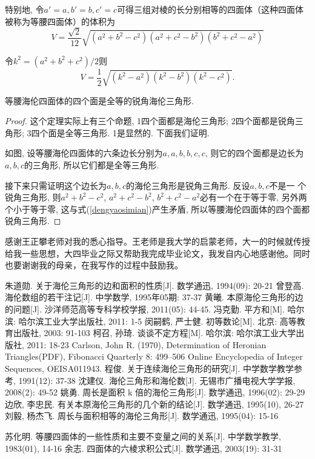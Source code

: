 \documentclass[12pt]{article}
\begin{document}
特别地, 令$a'=a,b'=b,c'=c$可得三组对棱的长分别相等的四面体（这种四面体被称为等腰四面体）的体积为
    \begin{equation}\label{dengyaosimian}
         V=\frac{\sqrt2}{12}\sqrt{(a^2+b^2-c^2)(a^2+c^2-b^2)(b^2+c^2-a^2)} 
    \end{equation}

令$k^2=(a^2+b^2+c^2)/2$则
    \begin{equation*}\label{tijik}
        V=\dfrac12\sqrt{(k^2-a^2)(k^2-b^2)(k^2-c^2)}.
    \end{equation*}

\begin{theorem}
    等腰海伦四面体的四个面是全等的锐角海伦三角形. 
\end{theorem}
\begin{proof}
    这个定理实际上有三个命题, \circled1四个面都是海伦三角形; \circled2四个面都是锐角三角形; \circled3四个面是全等三角形. \circled1是显然的. 下面我们证明. 

如图, 设等腰海伦四面体的六条边长分别为$a,a,b,b,c,c$, 则它的四个面都是边长为$a,b,c$的三角形, 所以它们都是全等三角形. 

接下来只需证明这个边长为$a,b,c$的海伦三角形是锐角三角形. 反设$a,b,c$不是一 个锐角三角形, 则$a^2+b^2-c^2$, $a^2+c^2-b^2$, $b^2+c^2-a^2$必有一个在于等于零, 另外两个小于等于零, 这与式(\ref{dengyaosimian})产生矛盾, 所以等腰海伦四面体的四个面都锐角三角形. 
\end{proof}

感谢王正攀老师对我的悉心指导。王老师是我大学的启蒙老师，大一的时候就传授给我一些思想，大四毕业之际又帮助我完成毕业论文，我发自内心地感谢他。同时也要谢谢我的母亲，在我写作的过程中鼓励我。

\begin{mybib}
朱道勋. 关于海伦三角形的边和面积的性质[J]. 数学通迅, 1994(09): 20-21
曾登高. 海伦数组的若干注记[J]. 中学数学, 1995年05期: 37-37
黄曦. 本原海伦三角形的边的问题[J]. 沙洋师范高等专科学校学报, 2011(05): 44-45.%
冯克勤. 平方和[M]. 哈尔滨: 哈尔滨工业大学出版社, 2011: 1-5
闵嗣鹤, 严士健. 初等数论[M]. 北京: 高等教育出版社, 2003: 91-103 %
柯召, 孙琦. 谈谈不定方程[M]. 哈尔滨: 哈尔滨工业大学出版社, 2011: 18-23
Carlson, John R. (1970), Determination of Heronian Triangles(PDF), Fibonacci Quarterly 8: 499–506
Online Encyclopedia of Integer Sequences, OEIS A011943.
程俊. 关于连续海伦三角形的研究[J]. 中学数学教学参考, 1991(12): 37-38
沈建仪. 海伦三角形和海伦数[J]. 无锡市广播电视大学学报, 2008(2): 49-52
姚勇. 周长是面积 k 倍的海伦三角形[J]. 数学通迅, 1996(02): 29-29
边欣, 李忠民. 有关本原海伦三角形的几个新的结论[J]. 数学通迅, 1995(10), 26-27
刘毅, 杨杰飞. 周长与面积相等的海伦三角形[J]. 数学通迅, 1995(04): 15-16

苏化明. 等腰四面体的一些性质和主要不变量之间的关系[J]. 中学数学教学, 1983(01), 14-16
余志. 四面体的六棱求积公式[J]. 数学通迅, 2003(19): 31-31
\end{mybib}
\end{document}
